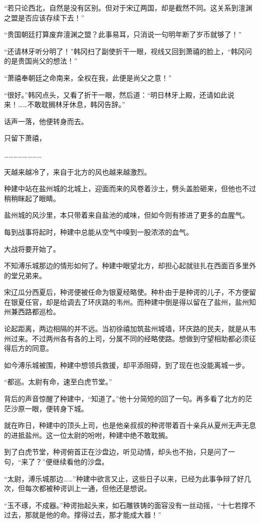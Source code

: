 “若只论西北，自然是没有区别。但对于宋辽两国，却是截然不同。这关系到澶渊之盟是否应该存续下去！”

“贵国朝廷打算废弃澶渊之盟？此事易耳，只消说一句明年断了岁币就够了！”

“还请林牙听分明了！”韩冈扫了副使折干一眼，视线又回到萧禧的脸上，“韩冈问的是贵国尚父的想法！”

“萧禧奉朝廷之命南来，全权在我，此便是尚父之意！”

“很好。”韩冈点头，又看了折干一眼，然后道：“明日林牙上殿，还请如此说来！……不敢耽搁林牙休息，韩冈告辞。”

话声一落，他便转身而去。

只留下萧禧，

……………………

天越来越冷了，来自于北方的风也越来越激烈。

种建中站在盐州城的北城上，迎面而来的风卷着沙土，劈头盖脸砸来，但他也不过稍稍眯起了眼睛。

盐州城的风沙里，本只带着来自盐池的咸味，但如今则有掺进了更多的血腥气。

每到战事将起时，种建中总能从空气中嗅到一股浓浓的血气。

大战将要开始了。

不知溥乐城那边的情形如何了。种建中眼望北方，却担心起就驻扎在西面百多里外的堂兄弟来。

宋辽瓜分西夏后，种谔便被任命为银夏经略使。种朴由于是种谔的儿子，不方便留在银夏任官，却是给调去了环庆路的韦州。而种建中倒是得以留在了盐州，盐州知州兼西路都巡检。

论起距离，两边相隔的并不远。当初徐禧加筑盐州城墙，环庆路的民夫，就是从韦州过来。不过两州各有各的上司，分属不同的经略使路。想做到守望相助都必须征得后方的同意。

如今溥乐城被围，种建中想领兵救援，却平添阻碍，到了现在也没能离城一步。

“都巡。太尉有命，速至白虎节堂。”

背后的声音惊醒了种建中，“知道了。”他十分简短的回了一句。再多看了北方的茫茫沙原一眼，便转身下城。

就在昨日，种建中的顶头上司，也是他亲叔叔的种谔带着百十亲兵从夏州无声无息的进抵盐州。这一位太尉的吩咐，种建中绝不敢耽搁。

到了白虎节堂，种谔俯首正在沙盘边，听见动情，却头也不抬，只是问了一句，“来了？”便继续看他的沙盘。

“太尉，溥乐城那边……”种建中欲言又止，这些日子以来，已经为此事争辩了好几次，但每次都被种谔训上一通，但他还是想说。

“玉不琢，不成器。”种谔抬起头来，如石雕铁铸的面容没有一丝动摇，“十七若撑不过去，那就是他的命。撑得过去，那才能成大器！”

